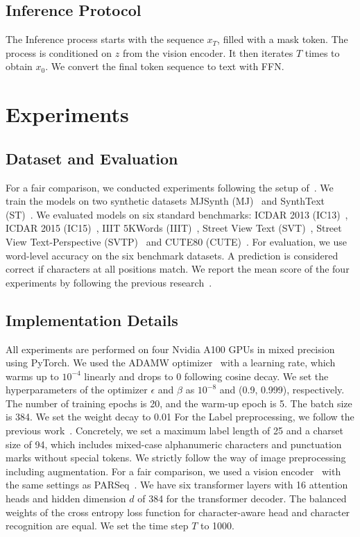 \documentclass{article}
\begin{document}
\subsection{Inference Protocol}
The Inference process starts with the sequence $x_{T}$, filled with a mask token.
The process is conditioned on $z$ from the vision encoder.
It then iterates $T$ times to obtain $x_{0}$.
We convert the final token sequence to text with FFN. 
\section{Experiments} \label{sec:experiments}



\subsection{Dataset and Evaluation}
For a fair comparison, we conducted experiments following the setup of~\cite{yu2020srn}.
We train the models on two synthetic datasets MJSynth (MJ)~\cite{jaderberg2014MJSynth, jaderberg2016MJSynth} and SynthText (ST)~\cite{gupta2016synthtext}.
We evaluated models on six standard benchmarks: ICDAR 2013 (IC13)~\cite{karatzas2013icdar}, ICDAR 2015 (IC15)~\cite{karatzas2015icdar}, IIIT 5KWords (IIIT)~\cite{mishra2012iiit}, Street View Text (SVT)~\cite{wang2011svt}, Street View Text-Perspective (SVTP)~\cite{phan2013svtp} and CUTE80 (CUTE)~\cite{risnumawan2014cute80}.
For evaluation, we use word-level accuracy on the six benchmark datasets.
A prediction is considered correct if characters at all positions match.
We report the mean score of the four experiments by following the previous research~\cite{bautista2022parseq}.


\subsection{Implementation Details}
All experiments are performed on four Nvidia A100 GPUs in mixed precision using PyTorch.
We used the ADAMW optimizer~\cite{loshchilov2018adamw} with a learning rate, which warms up to $10^{-4}$ linearly and drops to 0 following cosine decay.
We set the hyperparameters of the optimizer $\epsilon$ and $\beta$ as $10^{-8}$ and (0.9, 0.999), respectively.
The number of training epochs is 20, and the warm-up epoch is 5.
The batch size is 384.
We set the weight decay to 0.01
For the Label preprocessing, we follow the previous work~\cite{shi2018aster}. Concretely, we set a maximum label length of 25 and a charset size of 94, which includes mixed-case alphanumeric characters and punctuation marks without special tokens.
We strictly follow the way of image preprocessing~\cite{bautista2022parseq} including augmentation.
For a fair comparison, we used a vision encoder~\cite{dosovitskiy2020vit} with the same settings as PARSeq~\cite{bautista2022parseq}.
We have six transformer layers with 16 attention heads and hidden dimension $d$ of 384 for the transformer decoder.
The balanced weights of the cross entropy loss function for character-aware head and character recognition are equal.
We set the time step $T$ to 1000.
\end{document}
